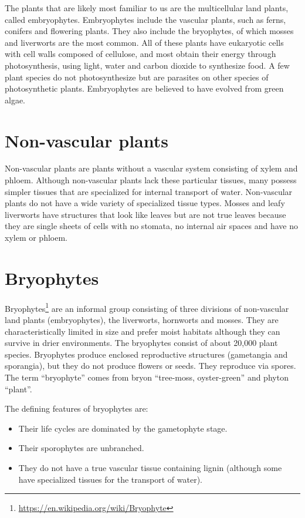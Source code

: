 \documentclass[]{book}
\providecommand{\tightlist}{%
  \setlength{\itemsep}{0pt}\setlength{\parskip}{0pt}}
\let\rmarkdownfootnote\footnote%
\def\footnote{\protect\rmarkdownfootnote}
\renewcommand{\href}[2]{#2\footnote{\url{#1}}}
\theoremstyle{definition}
\theoremstyle{definition}
\theoremstyle{definition}
\theoremstyle{remark}
\begin{document}
The plants that are likely most familiar to us are the multicellular
land plants, called embryophytes. Embryophytes include the vascular
plants, such as ferns, conifers and flowering plants. They also include
the bryophytes, of which mosses and liverworts are the most common. All
of these plants have eukaryotic cells with cell walls composed of
cellulose, and most obtain their energy through photosynthesis, using
light, water and carbon dioxide to synthesize food. A few plant species
do not photosynthesize but are parasites on other species of
photosynthetic plants. Embryophytes are believed to have evolved from
green algae.

\section{Non-vascular plants}\label{non-vascular-plants}

Non-vascular plants are plants without a vascular system consisting of
xylem and phloem. Although non-vascular plants lack these particular
tissues, many possess simpler tissues that are specialized for internal
transport of water. Non-vascular plants do not have a wide variety of
specialized tissue types. Mosses and leafy liverworts have structures
that look like leaves but are not true leaves because they are single
sheets of cells with no stomata, no internal air spaces and have no
xylem or phloem.

\section{Bryophytes}\label{bryophytes}

\href{https://en.wikipedia.org/wiki/Bryophyte}{Bryophytes} are an
informal group consisting of three divisions of non-vascular land plants
(embryophytes), the liverworts, hornworts and mosses. They are
characteristically limited in size and prefer moist habitats although
they can survive in drier environments. The bryophytes consist of about
20,000 plant species. Bryophytes produce enclosed reproductive
structures (gametangia and sporangia), but they do not produce flowers
or seeds. They reproduce via spores. The term ``bryophyte'' comes from
bryon ``tree-moss, oyster-green'' and phyton ``plant''.

The defining features of bryophytes are:

\begin{itemize}
\tightlist
\item
  Their life cycles are dominated by the gametophyte stage.
\item
  Their sporophytes are unbranched.
\item
  They do not have a true vascular tissue containing lignin (although
  some have specialized tissues for the transport of water).
\end{itemize}
\end{document}
